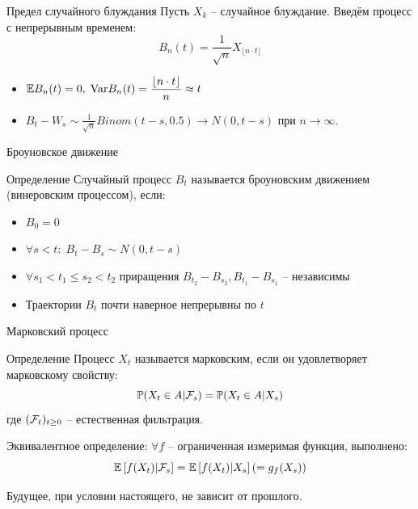 \documentclass{beamer}
\begin{document}
\begin{frame}{Предел случайного блуждания}
    Пусть $X_k$ -- случайное блуждание. Введём процесс с непрерывным временем:
    $$
        B_{n}(t) = \frac{1}{\sqrt{n}} X_{\lfloor n \cdot t \rfloor}
    $$
    \begin{itemize}
        \item $\mathbb{E} B_n(t) = 0, \; \mathrm{Var} B_n(t) = \dfrac{\lfloor n \cdot t \rfloor}{n} \approx t$
        \item $B_t - W_s \sim \frac{1}{\sqrt{n}} Binom(t-s, 0.5) \to N(0, t-s)$ при $n\to\infty$.
    \end{itemize}
\end{frame}

\begin{frame}{Броуновское движение}
    \begin{block}{Определение}
        Случайный процесс $B_t$ называется броуновским движением (винеровским процессом), если:
        \begin{itemize}
            \item $B_0 = 0$
            \item $\forall s < t: \; B_t - B_s \sim N(0, t - s)$
            \item $\forall s_1 < t_1 \leq s_2 < t_2$ приращения
            $B_{t_2} - B_{s_2}, B_{t_1} - B_{s_1}$ -- независимы
            \item Траектории $B_t$ почти наверное непрерывны по $t$ 
        \end{itemize}
    \end{block}
\end{frame}

\begin{frame}{Марковский процесс}
    \begin{block}{Определение}
        Процесс $X_t$ называется марковским, если он удовлетворяет марковскому свойству:
        $$
            \mathbb{P}(X_t \in A | \mathcal{F}_s) = \mathbb{P} (X_t \in A | X_s)
        $$где $(\mathcal{F}_t)_{t\geq0}$ -- естественная фильтрация.
    \end{block}
    Эквивалентное определение: $\forall f$ -- ограниченная измеримая функция, выполнено:
    $$
        \mathbb{E} \left[ f(X_t) | \mathcal{F}_s \right] = \mathbb{E} \left[ f(X_t) | X_s \right] \left(= g_f(X_s)\right)
    $$

    Будущее, при условии настоящего, не зависит от прошлого.
\end{frame}
\end{document}
